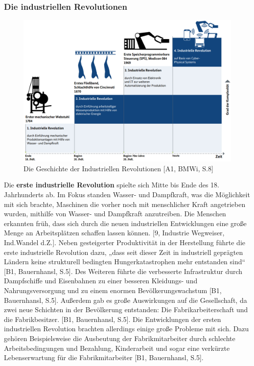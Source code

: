 \subsubsection{Die industriellen Revolutionen}\label{sec:IndustrielleRevolution}
\begin{figure}[h]
	\centering
	\includegraphics[width=1\linewidth]{Bilder/A1_DieGeschichteDerIndustriellenRevolutionenBMWI}
	\caption{Die Geschichte der Industriellen Revolutionen [A1, BMWi, S.8]}
	\label{fig:IndustrielleRevolutionenBild}
\end{figure}
Die \textbf{erste industrielle Revolution} spielte sich Mitte bis Ende des 18. Jahrhunderts ab. Im Fokus standen Wasser- und Dampfkraft, was die Möglichkeit mit sich brachte, Maschinen die vorher noch mit menschlicher Kraft angetrieben wurden, mithilfe von Wasser- und Dampfkraft anzutreiben. Die Menschen erkannten früh, dass sich durch die neuen industriellen Entwicklungen eine große Menge an Arbeitsplätzen schaffen lassen können. [9, Industrie Wegweiser, Ind.Wandel d.Z.]. Neben gesteigerter Produktivität in der Herstellung führte die erste industrielle Revolution dazu, „dass seit dieser Zeit in industriell geprägten Ländern keine strukturell bedingten Hungerkatastrophen mehr entstanden sind“ [B1, Bauernhansl, S.5]. Des Weiteren führte die verbesserte Infrastruktur durch Dampfschiffe und Eisenbahnen zu einer besseren Kleidungs- und Nahrungsversorgung und zu einem enormen Bevölkerungswachstum [B1, Bauernhansl, S.5]. Außerdem gab es große Auswirkungen auf die Gesellschaft, da zwei neue Schichten in der Bevölkerung entstanden: Die Fabrikarbeiterschaft und die Fabrikbesitzer. [B1, Bauernhansl, S.5]. Die Entwicklungen der ersten industriellen Revolution brachten allerdings einige große Probleme mit sich. Dazu gehören Beispielsweise die Ausbeutung der Fabrikmitarbeiter durch schlechte Arbeitsbedingungen und Bezahlung, Kinderarbeit und sogar eine verkürzte Lebenserwartung für die Fabrikmitarbeiter [B1, Bauernhansl, S.5].
